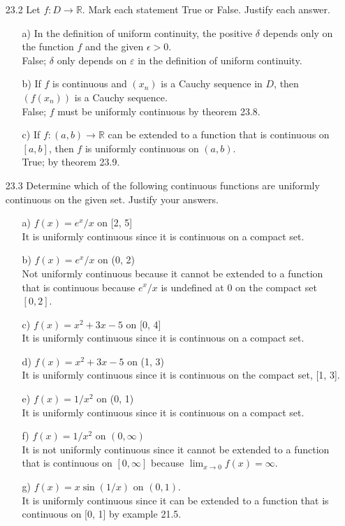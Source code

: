 \documentclass[12pt]{article}
\begin{document}
\begin{enumerate}
\item[23.2] Let $f: D \rightarrow \mathbb{R}$. Mark each statement True or False. Justify each answer.
\begin{enumerate}
\item[a)] In the definition of uniform continuity, the positive $\delta$ depends only on the function $f$ and the given $\epsilon > 0$.\\
False; $\delta$ only depends on $\varepsilon$ in the definition of
uniform continuity.
\item[b)] If $f$ is continuous and $(x_n)$ is a Cauchy sequence in $D$, then $(f(x_n))$ is a Cauchy sequence. \\
False; $f$ must be uniformly continuous by theorem 23.8.
\item[c)] If $f: (a, b) \rightarrow \mathbb{R}$ can be extended to a function that is continuous on $[a, b]$, then $f$ is uniformly continuous on $(a, b)$. \\
True; by theorem 23.9.
\end{enumerate}

\item[23.3] Determine which of the following continuous functions are uniformly continuous on the given set. Justify your answers.
\begin{enumerate}
\item[a)] $f(x) = e^x/x$ on [2, 5] \\
It is uniformly continuous since it is continuous on a compact set.
\item[b)] $f(x) = e^x/x$ on (0, 2) \\
Not uniformly continuous because it cannot be extended to a function
that is continuous because $e^x/x$ is undefined at $0$ on the compact set $[0, 2]$.
\item[c)] $f(x) = x^2 + 3x - 5$ on [0, 4] \\
It is uniformly continuous since it is continuous on a compact set.
\item[d)] $f(x) = x^2 + 3x - 5$ on (1, 3) \\
It is uniformly continuous since it is continuous on the compact set, [1, 3].
\item[e)] $f(x) = 1/x^2$ on (0, 1) \\
It is uniformly continuous since it is continuous on a compact set.
\item[f)] $f(x) = 1/x^2$ on $(0, \infty)$ \\
It is not uniformly continuous since it cannot be extended to a function
that is continuous on $[0, \infty]$ because $\lim_{x \to 0} f(x) = \infty$.
\item[g)] $f(x) = x \sin (1/x)$ on $(0, 1)$. \\
It is uniformly continuous since it can be extended to a function that
is continuous on [0, 1] by example 21.5.
\end{enumerate}


\end{enumerate}
\end{document}
